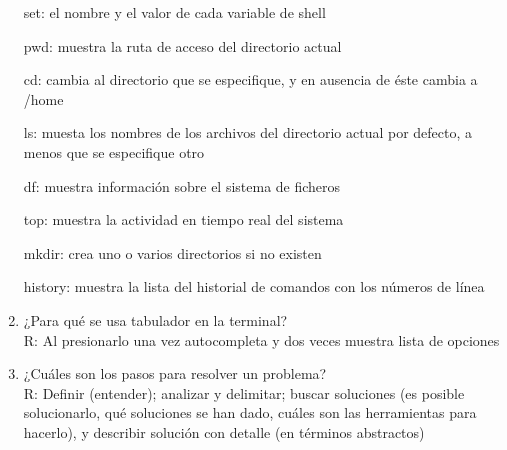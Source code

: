 \documentclass[etterpaper, 12pt, oneside]{article}%
\begin{document}
\begin{enumerate}
set: el nombre y el valor de cada variable de shell

pwd: muestra la ruta de acceso del directorio actual

cd: cambia al directorio que se especifique, y en ausencia de éste cambia a /home

ls: muesta los nombres de los archivos del directorio actual por defecto, a menos que se especifique otro

df: muestra información sobre el sistema de ficheros

top: muestra la actividad en tiempo real del sistema

mkdir: crea uno o varios directorios si no existen

history: muestra la lista del historial de comandos con los números de línea

		\item ¿Para qué se usa tabulador en la terminal?
		\\R: Al presionarlo una vez autocompleta y dos veces muestra lista de opciones
		
		\item ¿Cuáles son los pasos para resolver un problema?
		\\R: Definir (entender); analizar y delimitar; buscar soluciones (es posible solucionarlo, qué soluciones se han dado, cuáles son las herramientas para hacerlo), y describir solución con detalle (en términos abstractos)
		
	\end{enumerate}
	
\end{document}
